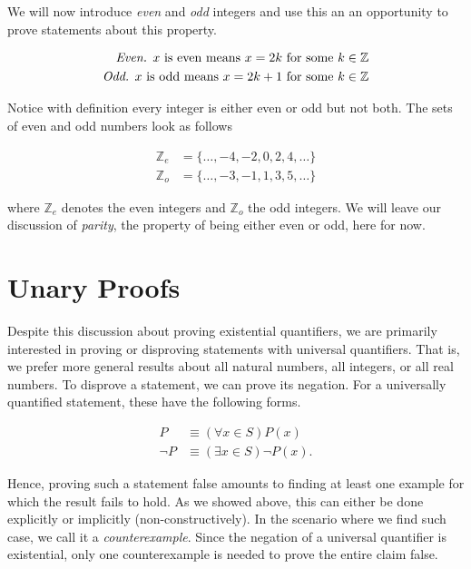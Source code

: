 \documentclass[twoside]{report}
\begin{document}
We will now introduce \emph{even} and \emph{odd} integers and use this an an opportunity to prove statements about this property.

\begin{align*}
	\emph{Even. } x \text{ is even means } x = 2k \text{ for some } k \in \mathbb{Z} \\
	\emph{Odd. }x \text{ is odd means } x = 2k + 1 \text{ for some } k \in \mathbb{Z}
\end{align*}

Notice with definition every integer is either even or odd but not both. The sets of even and odd numbers look as follows

\begin{align*}
	\mathbb{Z}_e &= \{ \dots, -4, -2, 0, 2, 4, \dots \} \\
	\mathbb{Z}_o &= \{ \dots, -3, -1, 1, 3, 5, \dots \}
\end{align*}

where $\mathbb{Z}_e$ denotes the even integers and $\mathbb{Z}_o$ the odd integers. We will leave our discussion of \emph{parity}, the property of being either even or odd, here for now.

\section{Unary Proofs}

Despite this discussion about proving existential quantifiers, we are primarily interested in proving or disproving statements with universal quantifiers. That is, we prefer more general results about all natural numbers, all integers, or all real numbers. To disprove a statement, we can prove its negation. For a universally quantified statement, these have the following forms.

\begin{align*}
	P &\equiv (\forall x \in S)P(x) \\
	\neg P &\equiv (\exists x \in S)\neg P(x).
\end{align*}

Hence, proving such a statement false amounts to finding at least one example for which the result fails to hold. As we showed above, this can either be done explicitly or implicitly (non-constructively). In the scenario where we find such case, we call it a \emph{counterexample}. Since the negation of a universal quantifier is existential, only one counterexample is needed to prove the entire claim false.
\end{document}
